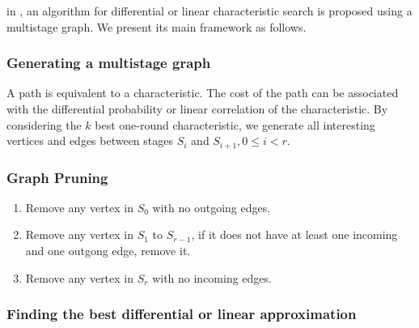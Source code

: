 in \cite{EPRINT:HalVej18}, an algorithm for differential or linear characteristic search is proposed using a multistage graph. We present its main framework as follows.

\subsubsection{Generating a multistage graph}
A path is equivalent to a characteristic. The cost of the path can be associated with the differential probability or linear correlation of the characteristic. By considering the $k$ best one-round characteristic, we generate all interesting vertices and edges between stages $S_i$ and $S_{i+1}, 0\leq i<r$.  

\subsubsection{Graph Pruning}
\begin{enumerate}
    \item Remove any vertex in $S_0$ with no outgoing edges.
    \item Remove any vertex in $S_1$ to $S_{r-1}$, if it does not have at least one incoming and one outgong edge, remove it.
    \item Remove any vertex in $S_r$ with no incoming edges.
\end{enumerate}


\subsubsection{Finding the best differential or linear approximation}